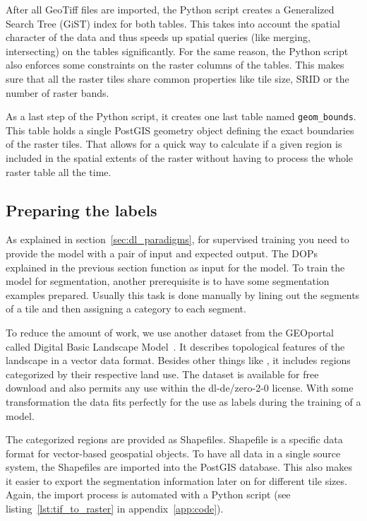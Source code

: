 After all GeoTiff files are imported, the Python script creates a Generalized Search Tree (GiST) index for both tables. This takes into account the spatial character of the data and thus speeds up spatial queries (like merging, intersecting) on the tables significantly. For the same reason, the Python script also enforces some constraints on the raster columns of the tables. This makes sure that all the raster tiles share common properties like tile size, SRID or the number of raster bands.

As a last step of the Python script, it creates one last table named \texttt{geom\_bounds}. This table holds a single PostGIS geometry object defining the exact boundaries of the raster tiles. That allows for a quick way to calculate if a given region is included in the spatial extents of the raster without having to process the whole raster table all the time.

\subsection{Preparing the labels}
As explained in section~\ref{sec:dl_paradigms}, for supervised training you need to provide the model with a pair of input and expected output. The DOPs explained in the previous section function as input for the model. To train the model for segmentation, another prerequisite is to have some segmentation examples prepared. Usually this task is done manually by lining out the segments of a tile and then assigning a category to each segment.

To reduce the amount of work, we use another dataset from the GEOportal called Digital Basic Landscape Model~\cite{base-dlm20}. It describes topological features of the landscape in a vector data format. Besides other things like , it includes regions categorized by their respective land use. The dataset is available for free download and also permits any use within the dl-de/zero-2-0 license. With some transformation the data fits perfectly for the use as labels during the training of a model.

The categorized regions are provided as Shapefiles. Shapefile is a specific data format for vector-based geospatial objects. To have all data in a single source system, the Shapefiles are imported into the PostGIS database. This also makes it easier to export the segmentation information later on for different tile sizes. Again, the import process is automated with a Python script (see listing~\ref{lst:tif_to_raster} in appendix~\ref{app:code}).

